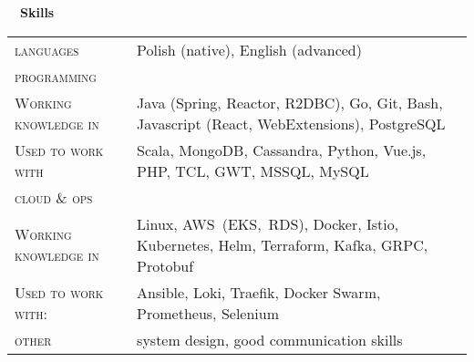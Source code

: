 \documentclass[a4paper, 11pt]{article}
\newcommand{\sectitle}[2]{\large{#1} \ \ \Large{\textbf{#2}}}
\begin{document}
	\begin{section}{\sectitle{\faCogs}{Skills}}
		\begin{tabularx}{\linewidth}{@{}l  X}
			\textsc{languages} & Polish (native), English (advanced) \\
			\textsc{programming} & \\
			\hfill \textsc{\footnotesize{Working knowledge in}} & Java (Spring, Reactor, R2DBC), Go, Git, Bash, Javascript (React, WebExtensions), PostgreSQL \\
			\hfill \textsc{\footnotesize{Used to work with}} & Scala, MongoDB, Cassandra, Python, Vue.js, PHP, TCL, GWT, MSSQL, MySQL \\
			\textsc{cloud \& ops} & \\
			\hfill \textsc{\footnotesize{Working knowledge in}} & Linux, AWS~(EKS,~RDS), Docker, Istio, Kubernetes, Helm, Terraform, Kafka, GRPC, Protobuf\\
			\hfill \textsc{\footnotesize{Used to work with:}} & Ansible, Loki, Traefik, Docker Swarm, Prometheus, Selenium \\
			\textsc{other} & system design, good communication skills 
		\end{tabularx}
	\end{section}
\end{document}

